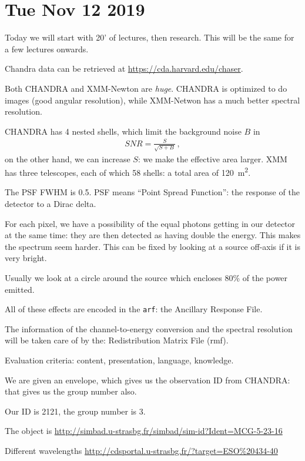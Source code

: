 \documentclass[main.tex]{subfiles}
\begin{document}
\section*{Tue Nov 12 2019}

Today we will start with 20' of lectures, then research.
This will be the same for a few lectures onwards.

Chandra data can be retrieved at \url{https://cda.harvard.edu/chaser}.

Both CHANDRA and XMM-Newton are \emph{huge}.
CHANDRA is optimized to do images (good angular resolution), while XMM-Netwon has a much better spectral resolution.

CHANDRA has 4 nested shells, which limit the background noise \(B\) in 
%
\begin{align}
  SNR = \frac{S}{\sqrt{S + B}}  
\,,
\end{align}
%
on the other hand, we can increase \(S\): we make the effective area larger. XMM has three telescopes, each of which 58 shells: a total area of \SI{120}{m^2}.

The PSF FWHM is \SI{0.5}{\arcsec}.
PSF means ``Point Spread Function'': the response of the detector to a Dirac delta.

For each pixel, we have a possibility of the equal photons getting in our detector at the same time: they are then detected as having double the energy. This makes the spectrum seem harder.
This can be fixed by looking at a source off-axis if it is very bright.

Usually we look at a circle around the source which encloses 80\% of the power emitted.

All of these effects are encoded in the \texttt{arf}: the Ancillary Response File.

The information of the channel-to-energy
conversion and the spectral resolution will be
taken care of by the:
Redistribution Matrix File (rmf).

Evaluation criteria: content, presentation, language, knowledge.

We are given an envelope, which gives us the observation ID from CHANDRA: that gives us the group number also.

Our ID is 2121, the group number is 3.

The object is \url{http://simbad.u-strasbg.fr/simbad/sim-id?Ident=MCG-5-23-16}

Different wavelengths \url{http://cdsportal.u-strasbg.fr/?target=ESO%20434-40}
\end{document}
